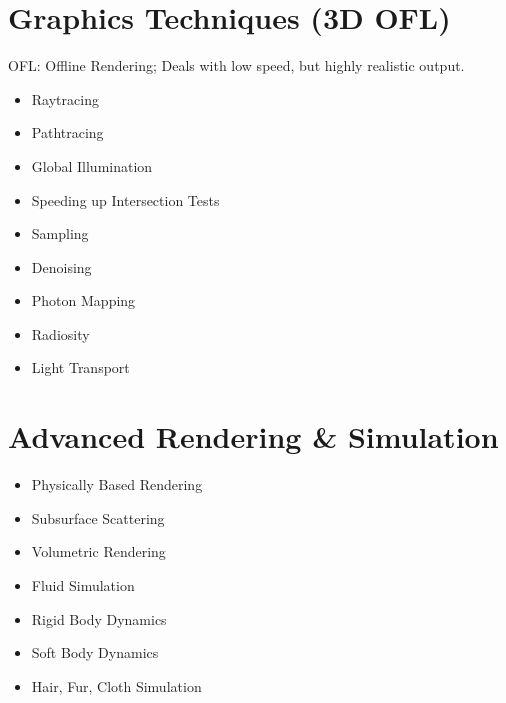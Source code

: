 \section{Graphics Techniques (3D OFL)}
OFL: Offline Rendering; Deals with low speed, but highly realistic output.
\begin{itemize}
    \item Raytracing
    \item Pathtracing
    \item Global Illumination
    \item Speeding up Intersection Tests
    \item Sampling
    \item Denoising
    \item Photon Mapping
    \item Radiosity
    \item Light Transport
\end{itemize}

\section{Advanced Rendering \& Simulation}
\begin{itemize}
\item Physically Based Rendering
\item Subsurface Scattering
\item Volumetric Rendering
\item Fluid Simulation
\item Rigid Body Dynamics
\item Soft Body Dynamics
\item Hair, Fur, Cloth Simulation
\end{itemize}
\clearpage